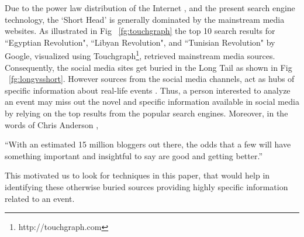 Due to the power law distribution of the Internet \cite{adamic2000power}, and the present search engine technology, the `Short Head' is generally dominated by the mainstream media websites. As illustrated in Fig ~\ref{fg:touchgraph} the top 10 search results for ``Egyptian Revolution", ``Libyan Revolution", and ``Tunisian Revolution" by Google, visualized using Touchgraph\footnote{http://touchgraph.com}, retrieved mainstream media sources. Consequently, the social media sites get buried in the Long Tail \cite{LOmariba} as shown in Fig ~\ref{fg:longvsshort}. However sources from the social media channels, act as hubs of specific information about real-life events \cite{harb2011arab}. Thus, a person interested to analyze an event may miss out the novel and specific information available in social media by relying on the top results from the popular search engines. Moreover, in the words of Chris Anderson \cite{anderson2008long}, \begin{itshape} \small ``With an estimated 15 million bloggers out there, the odds that a few will have something important and insightful to say are good and getting better.'' \end{itshape} This motivated us to look for techniques in this paper, that would help in identifying these otherwise buried sources providing highly specific information related to an event.

